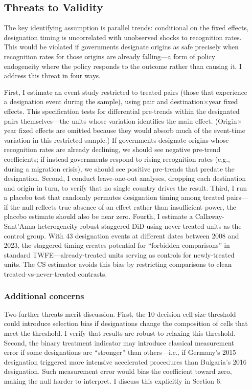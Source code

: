 \documentclass[12pt]{article}
\begin{document}
\subsection{Threats to Validity}

The key identifying assumption is parallel trends: conditional on the fixed effects, designation timing is uncorrelated with unobserved shocks to recognition rates. This would be violated if governments designate origins as safe precisely when recognition rates for those origins are already falling---a form of policy endogeneity where the policy responds to the outcome rather than causing it. I address this threat in four ways.

First, I estimate an event study restricted to treated pairs (those that experience a designation event during the sample), using pair and destination$\times$year fixed effects. This specification tests for differential pre-trends within the designated pairs themselves---the units whose variation identifies the main effect. (Origin$\times$year fixed effects are omitted because they would absorb much of the event-time variation in this restricted sample.) If governments designate origins whose recognition rates are already declining, we should see negative pre-trend coefficients; if instead governments respond to rising recognition rates (e.g., during a migration crisis), we should see positive pre-trends that predate the designation. Second, I conduct leave-one-out analyses, dropping each destination and origin in turn, to verify that no single country drives the result. Third, I run a placebo test that randomly permutes designation timing among treated pairs---if the null reflects true absence of an effect rather than insufficient power, the placebo estimate should also be near zero. Fourth, I estimate a Callaway-Sant'Anna heterogeneity-robust staggered DiD \citep{callaway2021difference} using never-treated units as the control group. With 43 designation events at different dates between 2008 and 2023, the staggered timing creates potential for ``forbidden comparisons'' in standard TWFE---already-treated units serving as controls for newly-treated units. The CS estimator avoids this bias by restricting comparisons to clean treated-vs-never-treated contrasts.

\subsubsection*{Additional concerns} Two further threats merit discussion. First, the 10-decision cell-size threshold could introduce selection bias if designations change the composition of cells that meet the threshold. I verify that results are robust to relaxing this threshold. Second, the binary treatment indicator may introduce classical measurement error if some designations are ``stronger'' than others---i.e., if Germany's 2015 designation triggered more intensive accelerated procedures than Bulgaria's 2016 designation. Such measurement error would bias the coefficient toward zero, making the null harder to interpret. I discuss this explicitly in Section 6.
\end{document}
